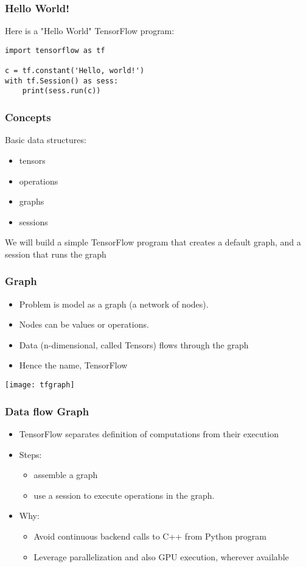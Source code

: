 \begin{frame}[fragile] \frametitle{Hello World!}
Here is a "Hello World" TensorFlow program:
\begin{lstlisting}
import tensorflow as tf

c = tf.constant('Hello, world!')
with tf.Session() as sess:
    print(sess.run(c))
\end{lstlisting}
\end{frame}

\begin{frame}[fragile] \frametitle{Concepts}
Basic data structures:
\begin{itemize}
\item tensors
\item operations
\item graphs
\item sessions
\end{itemize}
We will build a simple TensorFlow program that creates a default graph, and a session that runs the graph
\end{frame}


\begin{frame}[fragile] \frametitle{Graph}
\begin{itemize}
\item Problem is model as a graph (a network of nodes).
\item Nodes can be values or operations.
\item Data (n-dimensional, called Tensors) flows through the graph
\item Hence the name, TensorFlow
\end{itemize}
\begin{center}
\texttt{[image: tfgraph]}
\end{center}
\end{frame}

\begin{frame}[fragile] \frametitle{Data flow Graph}
\begin{itemize}
\item TensorFlow separates definition of computations from their execution
\item Steps:
\begin{itemize}
\item assemble a graph
\item use a session to execute operations in the graph.
\end{itemize}
\item Why:
\begin{itemize}
\item Avoid continuous backend calls to C++ from Python program
\item Leverage parallelization and also GPU execution, wherever available
\end{itemize}
\end{itemize}
\end{frame}

